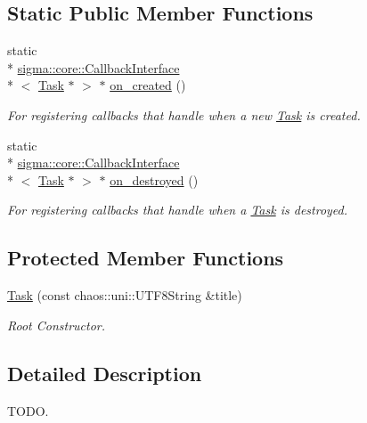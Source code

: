 \subsection*{Static Public Member Functions}
\begin{DoxyCompactItemize}
\item 
static \\*
\hyperlink{classsigma_1_1core_1_1_callback_interface}{sigma\-::core\-::\-Callback\-Interface}\\*
$<$ \hyperlink{classsigma_1_1core_1_1tasks_1_1_task}{Task} $\ast$ $>$ $\ast$ \hyperlink{classsigma_1_1core_1_1tasks_1_1_task_ab5adda36bbe6b20916f582ffeb311a13}{on\-\_\-created} ()
\begin{DoxyCompactList}\small\item\em For registering callbacks that handle when a new \hyperlink{classsigma_1_1core_1_1tasks_1_1_task}{Task} is created. \end{DoxyCompactList}\item 
static \\*
\hyperlink{classsigma_1_1core_1_1_callback_interface}{sigma\-::core\-::\-Callback\-Interface}\\*
$<$ \hyperlink{classsigma_1_1core_1_1tasks_1_1_task}{Task} $\ast$ $>$ $\ast$ \hyperlink{classsigma_1_1core_1_1tasks_1_1_task_a720571d12a0e2b41c918f448f5fc81db}{on\-\_\-destroyed} ()
\begin{DoxyCompactList}\small\item\em For registering callbacks that handle when a \hyperlink{classsigma_1_1core_1_1tasks_1_1_task}{Task} is destroyed. \end{DoxyCompactList}\end{DoxyCompactItemize}
\subsection*{Protected Member Functions}
\begin{DoxyCompactItemize}
\item 
\hyperlink{classsigma_1_1core_1_1tasks_1_1_task_a22316f108f9eeea2d2497b825b068c84}{Task} (const chaos\-::uni\-::\-U\-T\-F8\-String \&title)
\begin{DoxyCompactList}\small\item\em Root Constructor. \end{DoxyCompactList}\end{DoxyCompactItemize}


\subsection{Detailed Description}
T\-O\-D\-O. 

